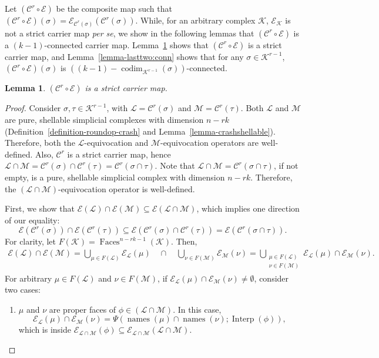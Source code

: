 \documentclass[11pt]{article}
\newcommand{\cC}{\ensuremath{\mathcal{C}}}
\newcommand{\cE}{\ensuremath{\mathcal{E}}}
\newcommand{\cK}{\ensuremath{\mathcal{K}}}
\newcommand{\cL}{\ensuremath{\mathcal{L}}}
\newcommand{\cM}{\ensuremath{\mathcal{M}}}
\DeclareMathOperator{\Faces}{Faces}
\DeclareMathOperator{\codim}{codim}
\DeclareMathOperator{\names}{names}\DeclareMathOperator{\name}{name}\DeclareMathOperator{\sgn}{sgn}
\newtheorem{lemma}[theorem]{Lemma}
\DeclareMathOperator{\interp}{Interp}
\begin{document}
Let $(\cC^r \circ \cE)$ be the composite map such that $(\cC^r \circ \cE)(\sigma) = \cE_{\cC^r(\sigma)}(\cC^r(\sigma))$.
While,
for an arbitrary complex $\cK$,
$\cE_{\cK}$ is not a strict carrier map \emph{per se},
we show in the following lemmas that $(\cC^r \circ \cE)$ is a $(k - 1)$-connected carrier map.
Lemma~\ref{lemma-lasttwo:strict} shows that $(\cC^r \circ \cE)$ is a strict carrier map,
and Lemma~\ref{lemma-lasttwo:conn} shows that
for any $\sigma \in \cK^{r-1}$,
$(\cC^r \circ \cE)(\sigma)$ is $((k - 1) - \codim_{\cK^{r-1}}(\sigma))$-connected.

\begin{lemma}
\label{lemma-lasttwo:strict}
$(\cC^r \circ \cE)$ is a strict carrier map.
\end{lemma}
\begin{proof}
Consider $\sigma,\tau \in \cK^{r-1}$,
with $\cL = \cC^r(\sigma)$ and $\cM = \cC^r(\tau)$.
Both $\cL$ and $\cM$ are pure, shellable simplicial complexes with dimension $n - rk$
(Definition~\ref{definition-roundop-crash} and Lemma~\ref{lemma-crashshellable}).
Therefore,
both the $\cL$-equivocation and $\cM$-equivocation operators are well-defined.
Also, $\cC^r$ is a strict carrier map,
hence $\cL \cap \cM = \cC^r(\sigma) \cap \cC^r(\tau) = \cC^r(\sigma \cap \tau)$.
Note that $\cL \cap \cM = \cC^r(\sigma \cap \tau)$,
if not empty,
is a pure, shellable simplicial complex with dimension $n - rk$.
Therefore,
the $(\cL \cap \cM)$-equivocation operator is well-defined.

First, we show that $\cE(\cL) \cap \cE(\cM) \subseteq \cE(\cL \cap \cM)$,
which implies one direction of our equality:
\begin{equation*}
\cE(\cC^r(\sigma)) \cap \cE(\cC^r(\tau)) \subseteq
\cE(\cC^r(\sigma) \cap \cC^r(\tau)) =
\cE(\cC^r(\sigma \cap \tau)) \mathrm{.}
\end{equation*}
For clarity, let $F(\cK) = \Faces^{n-rk-1}(\cK)$. Then,
\begin{align*}
\cE(\cL) \cap \cE(\cM)
= \bigcup_{\mu \in F(\cL)} \cE_{\cL}(\mu)
    \quad \cap \quad
    \bigcup_{\nu \in F(\cM)} \cE_{\cM}(\nu)
= \bigcup_{\substack{\mu \in F(\cL) \\ \nu \in F(\cM)}}
	\cE_{\cL}(\mu) \cap \cE_{\cM}(\nu) \mathrm{.}
\end{align*}
For arbitrary $\mu \in F(\cL)$ and $\nu \in F(\cM)$,
if $\cE_{\cL}(\mu) \cap \cE_{\cM}(\nu) \ne \emptyset$, consider two cases:
\begin{enumerate}
\item
$\mu$ and $\nu$ are proper faces of $\phi \in (\cL \cap \cM)$.
In this case,
$$  \cE_{\cL}(\mu) \cap \cE_{\cM}(\nu) = \Psi(\names(\mu) \cap \names(\nu); \interp(\phi)) \mathrm{,} $$
which is inside $\cE_{\cL \cap \cM}(\phi) \subseteq \cE_{\cL \cap \cM}(\cL \cap \cM)$.


\end{enumerate}
\end{proof}
\end{document}

